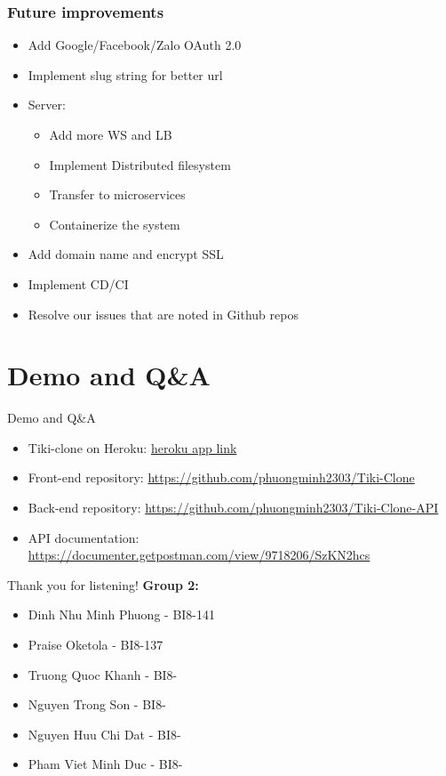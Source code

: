 \documentclass{beamer}
\begin{document}
\begin{frame}[fragile]
\frametitle{Future improvements}
    \begin{itemize}
    	\item Add Google/Facebook/Zalo OAuth 2.0
    	\item Implement slug string for better url
    	\item Server: 
    	    \begin{itemize}
    	        \item Add more WS and LB
    	        \item Implement Distributed filesystem
    	        \item Transfer to microservices
    	        \item Containerize the system
    	    \end{itemize}
        \item Add domain name and encrypt SSL
        \item Implement CD/CI 
        \item Resolve our issues that are noted in Github repos
	\end{itemize}
\end{frame}

\section{Demo and Q\&A}

\begin{frame}{Demo and Q\&A}
    \begin{itemize}
	    \item Tiki-clone on Heroku: 
	    \url{heroku app link}
	    \item Front-end repository: \url{https://github.com/phuongminh2303/Tiki-Clone}
	    \item Back-end repository: \url{https://github.com/phuongminh2303/Tiki-Clone-API}
	    \item API documentation: \url{https://documenter.getpostman.com/view/9718206/SzKN2hcs}
	\end{itemize}
\end{frame}
	
\begin{frame}{Thank you for listening!}
    \textbf{Group 2:}
    \begin{itemize}
        \item Dinh Nhu Minh Phuong - BI8-141
        \item Praise Oketola - BI8-137
        \item Truong Quoc Khanh - BI8-
        \item Nguyen Trong Son - BI8-
        \item Nguyen Huu Chi Dat - BI8-
        \item Pham Viet Minh Duc - BI8-
    \end{itemize}
\end{frame}
\end{document}
